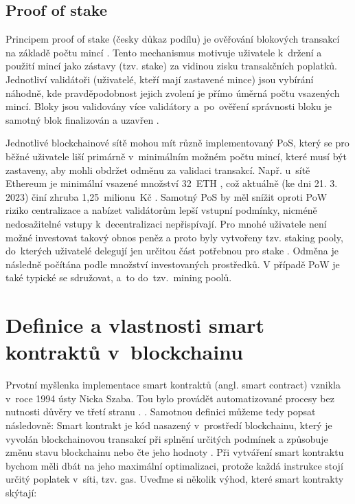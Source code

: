 \subsection{Proof of stake}
Principem proof of stake (česky důkaz podílu) je ověřování blokových transakcí na základě počtu  mincí \cite{POS}. Tento mechanismus motivuje uživatele k~držení a použití mincí jako zástavy (tzv. stake) za vidinou zisku transakčních poplatků. Jednotliví validátoři (uživatelé, kteří mají zastavené mince) jsou vybírání náhodně, kde pravděpodobnost jejich zvolení je přímo úměrná počtu vsazených mincí. Bloky jsou validovány více validátory a~po~ověření správnosti bloku je samotný blok finalizován a uzavřen \cite{POW_POS}. 

Jednotlivé blockchainové sítě mohou mít různě implementovaný PoS, který se pro běžné uživatele liší primárně v~minimálním možném počtu mincí, které musí být zastaveny, aby mohli obdržet odměnu za validaci transakcí. Např. u~sítě Ethereum je minimální vsazené množství 32~ETH \cite{ETH}, což aktuálně (ke dni 21. 3. 2023) činí zhruba 1,25~milionu~Kč \cite{coinmarketcap}. Samotný PoS by měl snížit oproti PoW riziko centralizace a nabízet validátorům lepší vstupní podmínky, nicméně nedosažitelné vstupy k~decentralizaci nepřispívají. Pro mnohé uživatele není možné investovat takový obnos peněz a proto byly vytvořeny tzv. staking pooly, do~kterých uživatelé delegují jen určitou část potřebnou pro stake \cite{ethereum}. Odměna je následně počítána podle množství investovaných prostředků. V případě PoW je také typické se sdružovat, a~to do~tzv.~mining poolů.

\section{Definice a vlastnosti smart kontraktů v~blockchainu}
\label{section:sc}
Prvotní myšlenka implementace smart kontraktů (angl. smart contract) vznikla v~roce 1994 ústy Nicka Szaba. Tou bylo provádět automatizované procesy bez nutnosti důvěry ve třetí stranu \cite{eth_sc}.  \cite{Voshmgir2017}. Samotnou definici můžeme tedy popsat následovně: Smart kontrakt je kód nasazený v~prostředí blockchainu, který je vyvolán blockchainovou transakcí při splnění určitých podmínek a způsobuje změnu stavu blockchainu nebo čte jeho hodnoty \cite{SC}. Při vytváření smart kontraktu bychom měli dbát na jeho maximální optimalizaci, protože každá instrukce stojí určitý poplatek v~síti, tzv. gas. Uveďme si několik výhod, které smart kontrakty skýtají:

